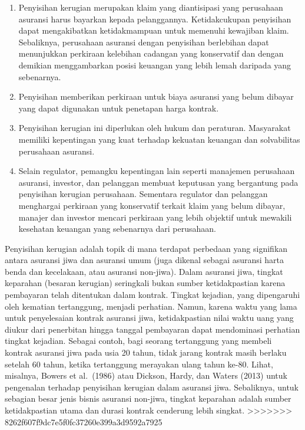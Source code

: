 \documentclass[
]{book}
\begin{document}
\begin{enumerate}
\def\labelenumi{\arabic{enumi}.}
\item
  Penyisihan kerugian merupakan klaim yang diantisipasi yang perusahaan asuransi harus bayarkan kepada pelanggannya. Ketidakcukupan penyisihan dapat mengakibatkan ketidakmampuan untuk memenuhi kewajiban klaim. Sebaliknya, perusahaan asuransi dengan penyisihan berlebihan dapat menunjukkan perkiraan kelebihan cadangan yang konservatif dan dengan demikian menggambarkan posisi keuangan yang lebih lemah daripada yang sebenarnya.
\item
  Penyisihan memberikan perkiraan untuk biaya asuransi yang belum dibayar yang dapat digunakan untuk penetapan harga kontrak.
\item
  Penyisihan kerugian ini diperlukan oleh hukum dan peraturan. Masyarakat memiliki kepentingan yang kuat terhadap kekuatan keuangan dan solvabilitas perusahaan asuransi.
\item
  Selain regulator, pemangku kepentingan lain seperti manajemen perusahaan asuransi, investor, dan pelanggan membuat keputusan yang bergantung pada penyisihan kerugian perusahaan. Sementara regulator dan pelanggan menghargai perkiraan yang konservatif terkait klaim yang belum dibayar, manajer dan investor mencari perkiraan yang lebih objektif untuk mewakili kesehatan keuangan yang sebenarnya dari perusahaan.
\end{enumerate}

Penyisihan kerugian adalah topik di mana terdapat perbedaan yang signifikan antara asuransi jiwa dan asuransi umum (juga dikenal sebagai asuransi harta benda dan kecelakaan, atau asuransi non-jiwa). Dalam asuransi jiwa, tingkat keparahan (besaran kerugian) seringkali bukan sumber ketidakpastian karena pembayaran telah ditentukan dalam kontrak. Tingkat kejadian, yang dipengaruhi oleh kematian tertanggung, menjadi perhatian. Namun, karena waktu yang lama untuk penyelesaian kontrak asuransi jiwa, ketidakpastian nilai waktu uang yang diukur dari penerbitan hingga tanggal pembayaran dapat mendominasi perhatian tingkat kejadian. Sebagai contoh, bagi seorang tertanggung yang membeli kontrak asuransi jiwa pada usia 20 tahun, tidak jarang kontrak masih berlaku setelah 60 tahun, ketika tertanggung merayakan ulang tahun ke-80. Lihat, misalnya, Bowers et al.~(1986) atau Dickson, Hardy, dan Waters (2013) untuk pengenalan terhadap penyisihan kerugian dalam asuransi jiwa. Sebaliknya, untuk sebagian besar jenis bisnis asuransi non-jiwa, tingkat keparahan adalah sumber ketidakpastian utama dan durasi kontrak cenderung lebih singkat.
>>>>>>> 8262f607f9dc7e5f0fc37260e399a3d9592a7925
\end{document}
